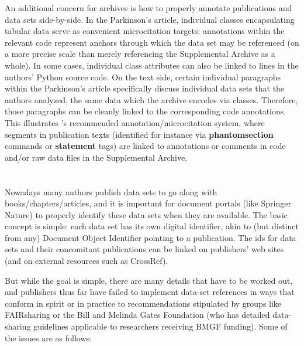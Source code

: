 \documentclass[11pt,letterpaper]{article}
\newcommand{\ATexttclr}[1]{\textcolor{tcolor}{\textbf{#1}}}
\newcommand{\JATS}{\resizebox{!}{7pt}{\AcronymText{JATS}}}
\newcommand{\textscc}[1]{{\color{orr!35!black}{{%
						\fontfamily{Cabin-TLF}\fontseries{b}\selectfont{\textsc{\scriptsize{#1}}}}}}}
\newcommand{\AcronymText}[1]{{\textscc{#1}}}
\newcommand{\SDRF}{\resizebox{!}{7pt}{\ATexttclr{SDRF}}}
\newcommand{\Cpp}{\resizebox{!}{7pt}{\AcronymText{C++}}}
\newcommand{\p}[1]{

\vspace{.7em}#1}
\let\OldLaTeX\LaTeX
\renewcommand{\LaTeX}{\resizebox{!}{7pt}{\color{orr!35!black}{\OldLaTeX}}}
\begin{document}
{\p{An additional concern for \SDRF{} archives is how to properly annotate 
publications and data sets side-by-side.  In the Parkinson's article, 
individual \Cpp{} classes encapsulating tabular data serve as 
convenient microcitation targets: annotations within the relevant 
\Cpp{} code represent anchors through which the data set may be 
referenced (on a more precise scale than merely referencing the 
Supplemental Archive as a whole).  In some cases, individual 
class attributes can also be linked to lines in the authors' 
Python source code.  On the text side, certain individual 
paragraphs within the Parkinson's article specifically discuss individual 
data sets that the authors analyzed, the same data which the \SDRF{} 
archive encodes via \Cpp{} classes.  Therefore, those paragraphs 
can be cleanly linked to the corresponding \Cpp{} code annotations.  
This illustrates \SDRF{}'s recommended annotation/microcitation 
system, where segments in publication texts (identified for 
instance via \LaTeX{} \textbf{phantomsection} commands or 
\JATS{} \textbf{statement} tags) are linked to annotations or 
comments in code and/or raw data files in the Supplemental 
Archive.}

\section{} 
 




\p{Nowadays many authors publish data sets to go along with books/chapters/articles, and it is important for document portals (like Springer Nature) to properly identify these data sets when they are available.  The basic concept is simple: each data set has its own digital identifier, akin to (but distinct from any) Document Object Identifier pointing to a publication.  The ids for data sets and their concomitant publications can be linked on publishers' web sites (and on external resources such as CrossRef).}

\p{But while the goal is simple, there are many details that have to be worked out, and publishers thus far have failed to implement data-set references in ways that conform in spirit or in practice to recommendations stipulated by groups like FAIRsharing or the Bill and Melinda Gates Foundation (who has detailed data-sharing guidelines applicable to researchers receiving BMGF funding).  Some of the issues are as follows:

}}
\end{document}
